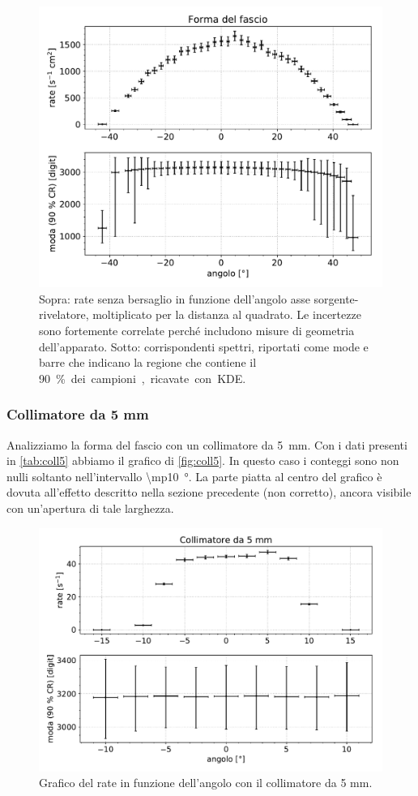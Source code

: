 \begin{figure}
\centering
\includegraphics[width=30 em]{immagini/forma}
\caption{Sopra: rate senza bersaglio in funzione dell'angolo asse sorgente-rivelatore,
moltiplicato per la distanza al quadrato.
Le incertezze sono fortemente correlate perché includono misure di geometria dell'apparato.
Sotto: corrispondenti spettri, riportati come mode
e barre che indicano la regione che contiene il \SI{90}\% dei campioni,
ricavate con KDE.}
\label{fig:forma}
\end{figure}

\subsubsection{Collimatore da 5\! mm}

Analizziamo la forma del fascio con un collimatore da \SI{5}{mm}.
Con i dati presenti in \autoref{tab:coll5} abbiamo il grafico di \autoref{fig:coll5}.
In questo caso i conteggi sono non nulli soltanto nell'intervallo \SI{\mp10}{\degree}. La parte piatta al centro del grafico è dovuta all'effetto descritto nella sezione precedente (non corretto), ancora visibile con un'apertura di tale larghezza.

\begin{figure}[h]
\centering
\includegraphics[width=30 em]{immagini/coll5}
\caption{Grafico del rate in funzione dell'angolo con il collimatore da 5\! mm.}
\label{fig:coll5}
\end{figure}

